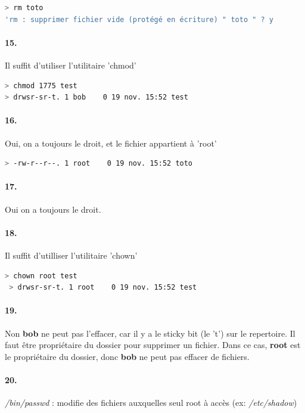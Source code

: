 \documentclass[10pt]{article}
\begin{document}
\begin{lstlisting}[language=bash]
> rm toto
'rm : supprimer fichier vide (protégé en écriture) " toto " ? y
\end{lstlisting}
        
        \paragraph{15.} Il suffit d'utiliser l'utilitaire 'chmod'
        
\begin{lstlisting}[language=bash]
> chmod 1775 test
> drwsr-sr-t. 1 bob    0 19 nov. 15:52 test
\end{lstlisting}

        \paragraph{16.} Oui, on a toujours le droit, et le fichier appartient à 'root'
\begin{lstlisting}[language=bash]
> -rw-r--r--. 1 root    0 19 nov. 15:52 toto
\end{lstlisting}
 
        \paragraph{17.}
        Oui on a toujours le droit.
        
        \paragraph{18.} Il suffit d'utilliser l'utilitaire 'chown'
 \begin{lstlisting}[language=bash]
 > chown root test
 > drwsr-sr-t. 1 root    0 19 nov. 15:52 test
\end{lstlisting}

        \paragraph{19.}
        Non \textbf{bob} ne peut pas l'effacer, car il y a le sticky bit (le 't') sur le repertoire.
        Il faut être propriétaire du dossier pour supprimer un fichier.
        Dans ce cas, \textbf{root} est le propriétaire du dossier, donc \textbf{bob} ne peut pas effacer de fichiers.
        
        \paragraph{20.}
        \textit{/bin/passwd} : modifie des fichiers auxquelles seul root à accès (ex: \textit{/etc/shadow})
        
\end{document}
